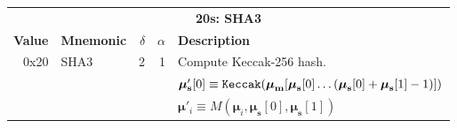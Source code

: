\documentclass[9pt,oneside]{amsart}
\begin{document}
\begin{tabular*}{\columnwidth}[h]{rlrrl}
\toprule
\multicolumn{5}{c}{\textbf{20s: SHA3}} \vspace{5pt} \\
\textbf{Value} & \textbf{Mnemonic} & $\delta$ & $\alpha$ & \textbf{Description} \vspace{5pt} \\
0x20 & {\small SHA3} & 2 & 1 & Compute Keccak-256 hash. \\
&&&& $\boldsymbol{\mu}'_\mathbf{s}[0] \equiv \mathtt{\tiny Keccak}(\boldsymbol{\mu}_\mathbf{m}[ \boldsymbol{\mu}_\mathbf{s}[0] \dots (\boldsymbol{\mu}_\mathbf{s}[0] + \boldsymbol{\mu}_\mathbf{s}[1] - 1) ])$ \\
&&&& $\boldsymbol{\mu}'_i \equiv M(\boldsymbol{\mu}_i, \boldsymbol{\mu}_\mathbf{s}[0], \boldsymbol{\mu}_\mathbf{s}[1])$ \\
\bottomrule
\end{tabular*}
\end{document}
